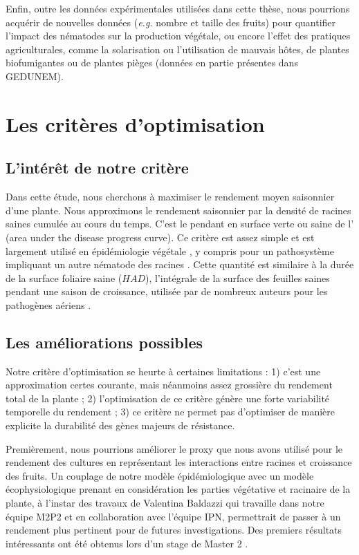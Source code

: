 	 Enfin, outre les données expérimentales utilisées dans cette thèse, nous pourrions acquérir de nouvelles données (\textit{e.g.} nombre et taille des fruits) pour quantifier l'impact des nématodes sur la production végétale, ou encore l'effet des  pratiques agriculturales, comme la solarisation ou l'utilisation de mauvais hôtes, de plantes
biofumigantes ou de plantes  pièges (données en partie présentes dans \gls{GEDUNEM}).
	
\section{Les critères d'optimisation}
	
\subsection{L’intérêt de notre critère}
	
	Dans cette étude, nous cherchons à maximiser le rendement moyen saisonnier d'une plante. Nous approximons le rendement saisonnier  par la densité de racines saines cumulée au cours du temps. C'est le pendant en surface \og verte\fg{} ou saine de l' (\og area under the disease progress curve\fg{}). Ce critère est assez simple et est largement utilisé en épidémiologie végétale \citep{Jeger2004, Rimbaud2018}, y compris pour un pathosystème impliquant un autre nématode des racines \citep{Tankam-Chedjou2020}. 
Cette quantité est similaire à la durée de la surface foliaire saine ($HAD$),
l'intégrale de la surface des feuilles saines pendant une saison de croissance,
utilisée par de nombreux auteurs pour les pathogènes aériens \citep{Waggoner1987,Gooding2000,vandenBosch2003,LoIacono2012,Elderfield2018,Papaix2018}.
	 
\subsection{Les améliorations possibles}
	
	Notre critère d'optimisation se heurte à certaines limitations :  1) c'est une approximation certes courante, mais néanmoins assez grossière du rendement total  de la plante ; 2) l'optimisation de ce critère génère une forte variabilité temporelle du rendement ;  3) ce critère ne permet pas d'optimiser  de manière explicite la durabilité  des gènes majeurs de résistance.
	
	Premièrement,  nous pourrions améliorer le proxy que nous avons utilisé pour le rendement des cultures en représentant les interactions entre racines et croissance des fruits. Un couplage de notre modèle épidémiologique avec un modèle écophysiologique prenant en considération les parties végétative et racinaire de la plante, à l'instar des travaux de Valentina Baldazzi qui travaille dans notre équipe M2P2 et en collaboration avec l'équipe IPN,  permettrait de passer à un rendement plus pertinent pour de futures investigations. Des premiers résultats intéressants ont été obtenus lors d'un stage de Master 2 \citep{Breniere2018}.
	
